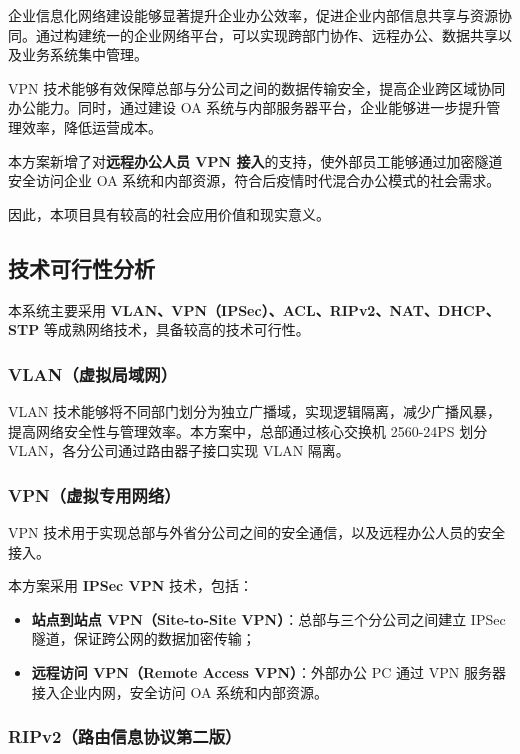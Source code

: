 \documentclass[12pt,a4paper]{ctexart}
\begin{document}
企业信息化网络建设能够显著提升企业办公效率，促进企业内部信息共享与资源协同。通过构建统一的企业网络平台，可以实现跨部门协作、远程办公、数据共享以及业务系统集中管理。

VPN 技术能够有效保障总部与分公司之间的数据传输安全，提高企业跨区域协同办公能力。同时，通过建设 OA 系统与内部服务器平台，企业能够进一步提升管理效率，降低运营成本。

本方案新增了对\textbf{远程办公人员 VPN 接入}的支持，使外部员工能够通过加密隧道安全访问企业 OA 系统和内部资源，符合后疫情时代混合办公模式的社会需求。

因此，本项目具有较高的社会应用价值和现实意义。

\subsection{技术可行性分析}

本系统主要采用 \textbf{VLAN、VPN（IPSec）、ACL、RIPv2、NAT、DHCP、STP} 等成熟网络技术，具备较高的技术可行性。

\subsubsection{VLAN（虚拟局域网）}

VLAN 技术能够将不同部门划分为独立广播域，实现逻辑隔离，减少广播风暴，提高网络安全性与管理效率。本方案中，总部通过核心交换机 2560-24PS 划分 VLAN，各分公司通过路由器子接口实现 VLAN 隔离。

\subsubsection{VPN（虚拟专用网络）}

VPN 技术用于实现总部与外省分公司之间的安全通信，以及远程办公人员的安全接入。

本方案采用 \textbf{IPSec VPN} 技术，包括：
\begin{itemize}
    \item \textbf{站点到站点 VPN（Site-to-Site VPN）}：总部与三个分公司之间建立 IPSec 隧道，保证跨公网的数据加密传输；
    \item \textbf{远程访问 VPN（Remote Access VPN）}：外部办公 PC 通过 VPN 服务器接入企业内网，安全访问 OA 系统和内部资源。
\end{itemize}

\subsubsection{RIPv2（路由信息协议第二版）}
\end{document}
